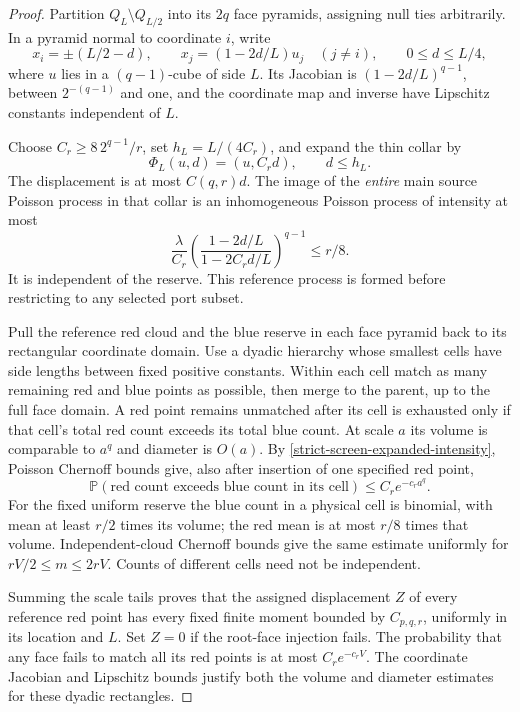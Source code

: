 \documentclass[11pt,reqno]{amsart}
\theoremstyle{definition}
\theoremstyle{remark}
\numberwithin{equation}{section}
\newcommand{\Pp}{\mathbb P}
\begin{document}
\begin{proof}
Partition \(Q_L\setminus Q_{L/2}\) into its \(2q\) face pyramids,
assigning null ties arbitrarily. In a pyramid normal to coordinate \(i\),
write
\[
 x_i=\pm(L/2-d),\qquad
 x_j=(1-2d/L)u_j\quad(j\ne i),\qquad
 0\le d\le L/4,
\]
where \(u\) lies in a \((q-1)\)-cube of side \(L\). Its Jacobian is
\((1-2d/L)^{q-1}\), between \(2^{-(q-1)}\) and one, and the coordinate
map and inverse have Lipschitz constants independent of \(L\).

Choose \(C_r\ge8\,2^{q-1}/r\), set \(h_L=L/(4C_r)\), and expand the
thin collar by
\[
 \Phi_L(u,d)=(u,C_rd),\qquad d\le h_L.
\]
The displacement is at most \(C(q,r)d\). The image of the
\emph{entire} main source Poisson process in that collar is an
inhomogeneous Poisson process of intensity at most
\begin{equation}
\label{strict-screen-expanded-intensity}
 \frac{\lambda}{C_r}
       \left(\frac{1-2d/L}{1-2C_rd/L}\right)^{q-1}
                 \le r/8.
\end{equation}
It is independent of the reserve. This reference process is formed
before restricting to any selected port subset.

Pull the reference red cloud and the blue reserve in each face pyramid
back to its rectangular coordinate domain. Use a dyadic hierarchy whose
smallest cells have side lengths between fixed positive constants.
Within each cell match as many remaining red and blue points as possible,
then merge to the parent, up to the full face domain. A red point remains
unmatched after its cell is exhausted only if that cell's total red
count exceeds its total blue count. At scale \(a\) its volume is comparable
to \(a^q\) and diameter is \(O(a)\). By
\eqref{strict-screen-expanded-intensity}, Poisson Chernoff bounds give,
also after insertion of one specified red point,
\begin{equation}
\label{strict-screen-reference-tail}
 \Pp(\text{red count exceeds blue count in its cell})
                    \le C_r e^{-c_r a^q}.
\end{equation}
For the fixed uniform reserve the blue count in a physical cell is
binomial, with mean at least \(r/2\) times its volume; the red mean
is at most \(r/8\) times that volume. Independent-cloud Chernoff bounds
give the same estimate uniformly for \(rV/2\le m\le2rV\).
Counts of different cells need not be independent.

Summing the scale tails proves that the assigned displacement \(Z\) of
every reference red point has every fixed finite moment bounded by
\(C_{p,q,r}\), uniformly in its location and \(L\). Set \(Z=0\) if the
root-face injection fails. The probability that any face fails to match
all its red points is at most \(C_r e^{-c_rV}\).
The coordinate Jacobian and Lipschitz bounds justify both the volume
and diameter estimates for these dyadic rectangles.


\end{proof}
\end{document}
